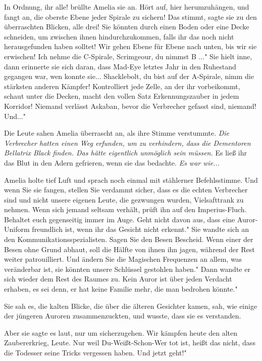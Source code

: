 \glqq In Ordnung, ihr alle!\grqq{} brüllte Amelia sie an. \glqq Hört auf, hier
herumzuhängen, und fangt an, die oberste Ebene jeder Spirale zu sichern! Das
stimmt\grqq{}, sagte sie zu den überraschten Blicken, \glqq alle drei! Sie
könnten durch einen Boden oder eine Decke schneiden, um zwischen ihnen
hindurchzukommen, falls ihr das noch nicht herausgefunden haben solltet! Wir
gehen Ebene für Ebene nach unten, bis wir sie erwischen! Ich nehme die
C-Spirale, Scrimgeour, du nimmst B ..." Sie hielt inne, dann erinnerte sie sich
daran, dass Mad-Eye letztes Jahr in den Ruhestand gegangen war, wen konnte
sie... \glqq Shacklebolt, du bist auf der A-Spirale, nimm die stärksten anderen
Kämpfer! Kontrolliert jede Zelle, an der ihr vorbeikommt, schaut unter die
Decken, macht den vollen Satz Erkennungszauber in jedem Korridor! Niemand
verlässt Askaban, bevor die Verbrecher gefasst sind, niemand! Und..."

Die Leute sahen Amelia überrascht an, als ihre Stimme verstummte. \emph{Die
Verbrecher hatten einen Weg erfunden, um zu verhindern, dass die Dementoren
Bellatrix Black finden. Das hätte eigentlich unmöglich sein müssen.} Es ließ ihr
das Blut in den Adern gefrieren, wenn sie das bedachte. \emph{Es war wie...}

Amelia holte tief Luft und sprach noch einmal mit stählerner Befehlsstimme.
\glqq Und wenn Sie sie fangen, stellen Sie verdammt sicher, dass es die echten
Verbrecher sind und nicht unsere eigenen Leute, die gezwungen wurden,
Vielsafttrank zu nehmen. Wenn sich jemand seltsam verhält, prüft ihn auf den
Imperius-Fluch. Behaltet euch gegenseitig immer im Auge. Geht nicht davon aus,
dass eine Auror-Uniform freundlich ist, wenn ihr das Gesicht nicht erkennt." Sie
wandte sich an den Kommunikationsspezialisten. \glqq Sagen Sie den Besen
Bescheid. Wenn einer der Besen ohne Grund abhaut, soll die Hälfte von ihnen ihn
jagen, während der Rest weiter patrouilliert. Und ändern Sie die Magischen
Frequenzen an allem, was veränderbar ist, sie könnten unsere Schlüssel gestohlen
haben." Dann wandte er sich wieder dem Rest des Raumes zu. \glqq Kein Auror ist
über jeden Verdacht erhaben, es sei denn, er hat keine Familie mehr, die man
bedrohen könnte."

Sie sah es, die kalten Blicke, die über die älteren Gesichter kamen, sah, wie
einige der jüngeren Auroren zusammenzuckten, und wusste, dass sie es verstanden.

Aber sie sagte es laut, nur um sicherzugehen. \glqq Wir kämpfen heute den alten
Zaubererkrieg, Leute. Nur weil Du-Weißt-Schon-Wer tot ist, heißt das nicht, dass
die Todesser seine Tricks vergessen haben. Und jetzt geht!"

